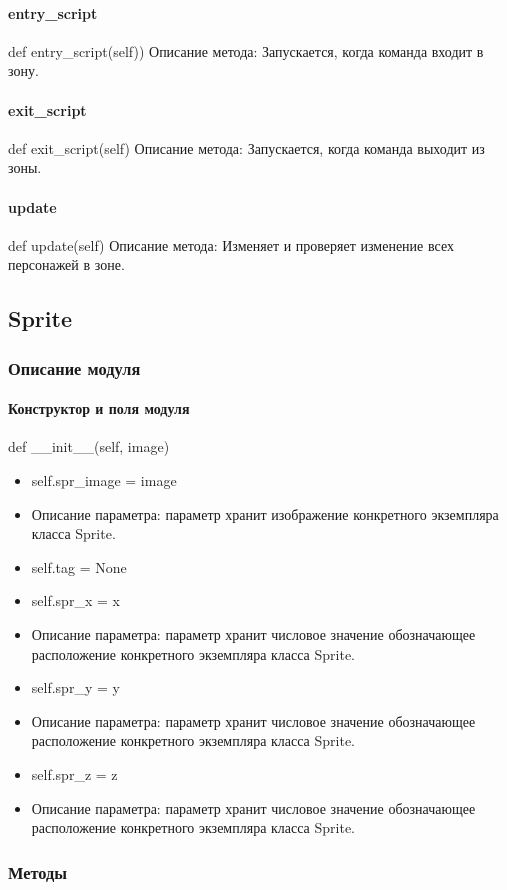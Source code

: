 \paragraph{entry\_script}
def entry\_script(self))
Описание метода: Запускается, когда команда входит в зону.
\paragraph{exit\_script}
def exit\_script(self)
Описание метода: Запускается, когда команда выходит из зоны.
\paragraph{update}
def update(self)
Описание метода: Изменяет и проверяет изменение всех персонажей в зоне.

\subsection{Sprite}
\subsubsection{Описание модуля}
\paragraph{Конструктор и поля модуля}
def \_\_init\_\_(self, image)
\begin{itemize}
	\item self.spr\_image = image
	\item Описание параметра: параметр хранит изображение конкретного экземпляра класса Sprite.
	\item self.tag = None
	\item self.spr\_x = x
	\item Описание параметра: параметр хранит числовое значение обозначающее расположение конкретного экземпляра класса Sprite.
	\item self.spr\_y = y
	\item Описание параметра: параметр хранит числовое значение обозначающее расположение конкретного экземпляра класса Sprite.
	\item self.spr\_z = z
	\item Описание параметра: параметр хранит числовое значение обозначающее расположение конкретного экземпляра класса Sprite.
\end{itemize}
\subsubsection{Методы}
